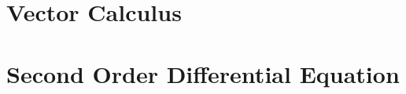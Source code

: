 \documentclass[11pt]{amsbook}
\numberwithin{equation}{chapter}
\begin{document}
\frontmatter

\tableofcontents

\mainmatter




\chapter{Vector Calculus}
\chapter{Second Order Differential Equation}


\end{document}
